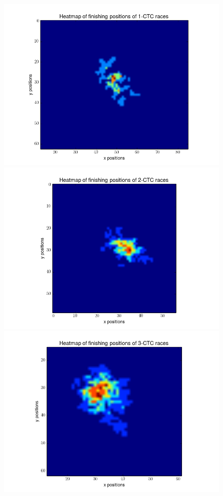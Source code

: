 \documentclass[12pt]{article}
\begin{document}
\begin{figure}[H]
	\centering
	\includegraphics[scale=0.40]{img/1ctc_heat}
	\includegraphics[scale=0.40]{img/2ctc_heat}
	\includegraphics[scale=0.40]{img/3ctc_heat}

\end{figure}
\end{document}
